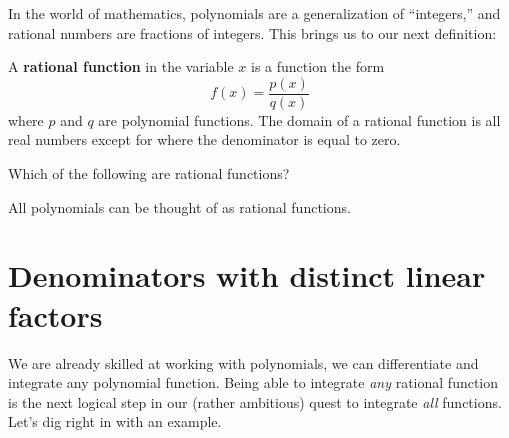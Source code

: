 \documentclass{ximera}
\begin{document}
In the world of mathematics, polynomials are a generalization of
``integers,'' and rational numbers are fractions of integers. This
brings us to our next definition:

\begin{definition}
  A \textbf{rational function} in the variable $x$ is a function the form
  \[
  f(x) = \frac{p(x)}{q(x)}
  \]
  where $p$ and $q$ are polynomial functions. The domain of a rational
  function is all real numbers except for where the denominator is
  equal to zero.
\end{definition}

\begin{question}
  Which of the following are rational functions?
  \begin{selectAll}
  \end{selectAll}
  \begin{feedback}
    All polynomials can be thought of as rational functions.
  \end{feedback}
\end{question}


\section{Denominators with distinct linear factors}


We are already skilled at working with polynomials, we can
differentiate and integrate any polynomial function. Being able to
integrate \textit{any} rational function is the next logical step in
our (rather ambitious) quest to integrate \textit{all}
functions. Let's dig right in with an example.
\end{document}
